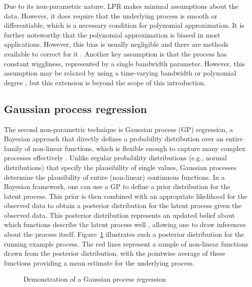 \documentclass[man, floatsintext]{apa7}
\begin{document}
Due to its non-parametric nature, LPR makes minimal assumptions about the data.
However, it does require that the underlying process is smooth or
differentiable, which is a necessary condition for polynomial approximation.
It is further noteworthy that the polynomial approximation is biased in
most applications. However, this bias is usually negligible and there are
methods available to correct for it \parencite{R-nprobust}.
Another key assumption is that the process has constant
wiggliness, represented by a single bandwidth parameter. However,
this assumption may be relaxed by using a time-varying bandwidth
\parencite{fan_data-driven_1995} or
polynomial degree \parencite{fan_adaptive_1995}, but this extension
is beyond the scope of this introduction.

\subsection{Gaussian process regression}

The second non-parametric technique is Gaussian process (GP) regression, a
Bayesian approach that directly defines a probability distribution over an
entire family of non-linear functions, which is flexible enough to capture
many complex processes effectively \parencite{rasmussen_gaussian_2006,
  betancourt_robust_2020, roberts_gaussian_2013}. Unlike regular probability
distributions (e.g., normal distributions) that specify the plausibility of
single values, Gaussian processes determine the plausibility of entire
(non-linear) continuous functions. In a Bayesian framework, one can use a GP to
define
a prior distribution for the latent process. This prior is then combined
with an appropriate likelihood for the observed data to obtain a posterior
distribution for the latent process given the observed data.
This posterior distribution represents an updated belief about which functions
describe the latent process well
\parencite{kruschke_doing_2011}, allowing one to draw inferences about the
process itself. Figure~\ref{fig:gp_dem} illustrates such a posterior
distribution for the running
example process. The red lines represent a sample of non-linear functions
drawn from the posterior distribution, with the pointwise average of these
functions providing a mean estimate for the underlying process.

\begin{figure}[!ht]
  \caption{Demonstration of a Gaussian process regression}
  \label{fig:gp_dem}
\end{figure}
\end{document}
